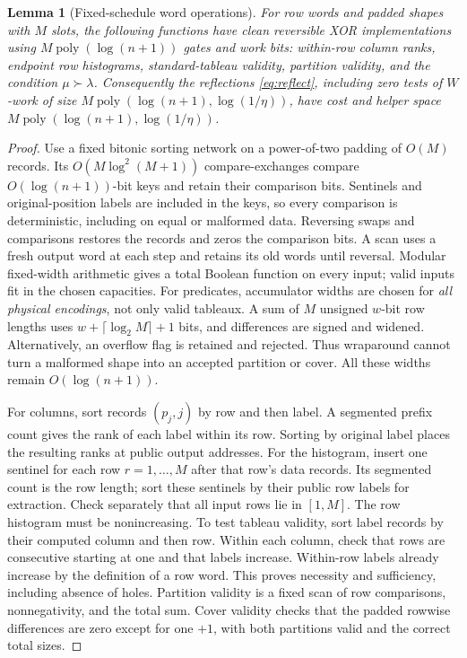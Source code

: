 \documentclass[11pt]{article}
\newtheorem{lemma}[theorem]{Lemma}
\theoremstyle{definition}
\newcommand{\poly}{\operatorname{poly}}
\begin{document}
\begin{lemma}[Fixed-schedule word operations]\label{lem:words}
For row words and padded shapes with $M$ slots, the following functions have
clean reversible XOR implementations using $M\poly(\log(n+1))$ gates and
work bits: within-row column ranks, endpoint row histograms, standard-tableau
validity, partition validity, and the condition $\mu\succ\lambda$.
Consequently the reflections \eqref{eq:reflect}, including zero tests of
$W$-work of size $M\poly(\log(n+1),\log(1/\eta))$, have cost and helper
space $M\poly(\log(n+1),\log(1/\eta))$.
\end{lemma}

\begin{proof}
Use a fixed bitonic sorting network on a power-of-two padding of $O(M)$
records. Its $O(M\log^2(M+1))$ compare-exchanges compare $O(\log(n+1))$-bit
keys and retain their comparison bits. Sentinels and original-position
labels are included in the keys, so every comparison is deterministic,
including on equal or malformed data. Reversing swaps and comparisons
restores the records and zeros the comparison bits. A scan uses a fresh
output word at each step and retains its old words until reversal. Modular
fixed-width arithmetic gives a total Boolean function on every input;
valid inputs fit in the chosen capacities.
For predicates, accumulator widths are chosen for \emph{all physical
encodings}, not only valid tableaux. A sum of $M$ unsigned $w$-bit
row lengths uses $w+\lceil\log_2 M\rceil+1$ bits, and differences are
signed and widened. Alternatively, an overflow flag is retained and
rejected. Thus wraparound cannot turn a malformed shape into an accepted
partition or cover. All these widths remain $O(\log(n+1))$.

For columns, sort records $(p_j,j)$ by row and then label. A segmented
prefix count gives the rank of each label within its row. Sorting by
original label places the resulting ranks at public output addresses.
For the histogram, insert one sentinel for each row $r=1,\ldots,M$ after
that row's data records. Its segmented count is the row length; sort these
sentinels by their public row labels for extraction. Check separately that
all input rows lie in $[1,M]$. The row histogram must be nonincreasing.
To test tableau validity, sort label records by their computed column and
then row. Within each column, check that rows are consecutive starting at
one and that labels increase. Within-row labels already increase by the
definition of a row word. This proves necessity and sufficiency, including
absence of holes. Partition validity is a fixed scan of row comparisons,
nonnegativity, and the total sum. Cover validity checks that the padded
rowwise differences are zero except for one $+1$, with both partitions
valid and the correct total sizes.


\end{proof}
\end{document}
